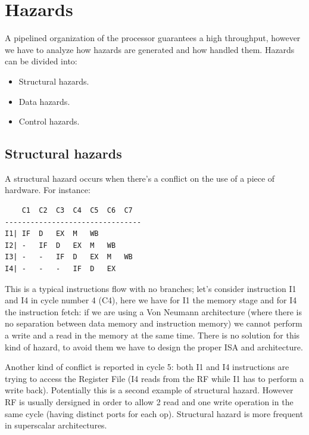 \section{Hazards}
A pipelined organization of the processor guarantees a high throughput, however
we have to analyze how hazards are generated and how handled them. Hazards can
be divided into:
\begin{itemize}
  \item Structural hazards.
  \item Data hazards.
  \item Control hazards.
\end{itemize}


\subsection{Structural hazards}
A structural hazard occurs when there's a conflict on the use of a piece of
hardware. For instance:

\begin{verbatim}
    C1  C2  C3  C4  C5  C6  C7
--------------------------------
I1| IF  D   EX  M   WB
I2| -   IF  D   EX  M   WB
I3| -   -   IF  D   EX  M   WB
I4| -   -   -   IF  D   EX
\end{verbatim}

This is a typical instructions flow with no branches; let's consider instruction
I1 and I4 in cycle number 4 (C4), here we have for I1 the memory stage and for
I4 the instruction fetch: if we are using a Von Neumann architecture (where
there is no separation between data memory and instruction memory) we cannot
perform a write and a read in the memory at the same time. There is no solution
for this kind of hazard, to avoid them we have to design the proper ISA and
architecture.

Another kind of conflict is reported in cycle 5: both I1 and I4 instructions are
trying to access the Register File (I4 reads from the RF while I1 has to perform
a write back).  Potentially this is a second example of structural hazard.
However RF is usually dersigned in order to allow 2 read and one write operation
in the same cycle (having distinct ports for each op).
Structural hazard is more frequent in superscalar architectures.

